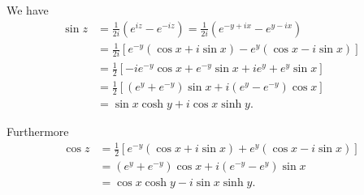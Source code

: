 \documentclass{article}
\begin{document}
\begin{Answer}
We have
\begin{align*}
   \sin z
&= \frac{1}{2i}(e^{iz} - e^{-iz})
 = \frac{1}{2i}(e^{-y + ix} - e^{y - ix}) \\
&= \frac{1}{2i}
     [   e^{-y}(\cos x + i \sin x)
       - e^{y}(\cos x - i \sin x)
     ] \\
&= \frac{1}{2}
     [
       -  i e^{-y} \cos x
       +    e^{-y} \sin x
       +  i e^{y}
       +    e^{y}  \sin x
     ] \\
&= \frac{1}{2}[
       (e^y + e^{-y}) \sin x
    + i(e^y - e^{-y}) \cos x
   ] \\
&= \sin x \cosh y + i \cos x \sinh y.
\end{align*}

Furthermore
\begin{align*}
   \cos z
&= \frac{1}{2}[
     e^{-y}(\cos x + i \sin x)
   + e^{y} (\cos x - i \sin x)
   ] \\
&= (e^{y} + e^{-y}) \cos x + i (e^{-y} - e^y) \sin x \\
&= \cos x \cosh y - i \sin x \sinh y.
\end{align*}

\end{Answer}
\end{document}
